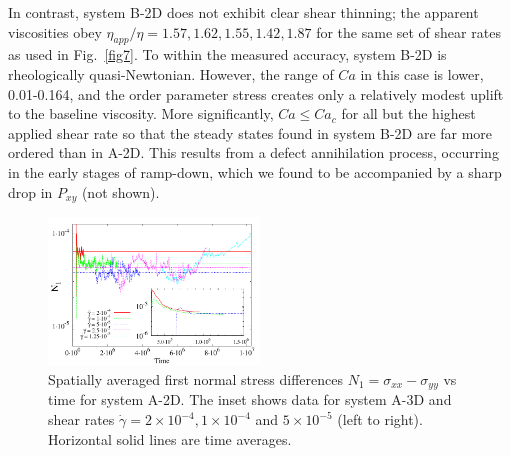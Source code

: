 \documentclass[8.5pt,twoside,twocolumn]{article}
\begin{document}
In contrast, system B-2D does not exhibit clear shear thinning; the apparent viscosities obey $\eta_{app}/\eta=1.57, 1.62, 1.55, 1.42, 1.87$ for the same set of shear rates as used in Fig.~\ref{fig7}. To within the measured accuracy, system B-2D is rheologically quasi-Newtonian. However, the range of $Ca$ in this case is lower, 0.01-0.164, and the order parameter stress creates only a relatively modest uplift to the baseline viscosity. More significantly, $Ca\le Ca_c$ for all but the highest applied shear rate so that the steady states found in system B-2D are far more ordered than in A-2D. This results from a defect annihilation process, occurring in the early stages of ramp-down, which we found to be accompanied by a sharp drop in $P_{xy}$ (not shown).

\begin{figure}[htp!]
\centering
\includegraphics[angle=0,width=0.5\textwidth]{N1_t_5e-4.pdf}
\caption{Spatially averaged first normal stress differences $N_1= \sigma_{xx}-\sigma_{yy}$ vs time for system A-2D. The inset shows data for system A-3D and shear rates $\dot{\gamma}=2\times10^{-4}, 1\times10^{-4}$ and $5\times10^{-5}$ (left to right). Horizontal solid lines are time averages.}
\label{fig8}
\end{figure}
\end{document}
